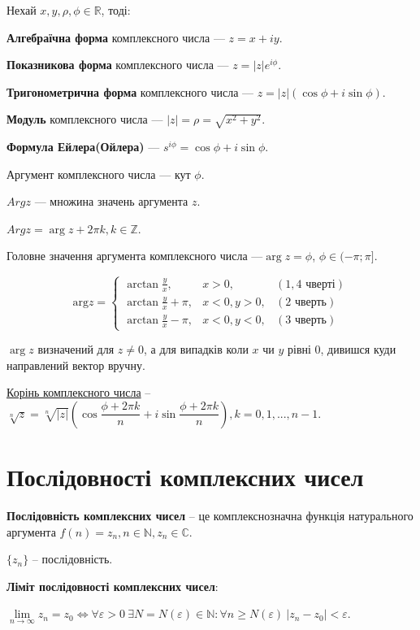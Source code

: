 Нехай $x, y, \rho, \phi \in \mathbb{R}$, тоді:

\textbf{Алгебраїчна форма} комплексного числа --- $z = x + iy$.

\textbf{Показникова форма} комплексного числа --- $z = |z|e^{i \phi}$.

\textbf{Тригонометрична форма} комплексного числа --- $z = |z| (\cos \phi + i \sin \phi)$.

\textbf{Модуль} комплексного числа --- $|z| = \rho = \sqrt{x^2 + y^2}$.

\textbf{Формула Ейлера(Ойлера)} --- $s^{i \phi} = \cos \phi + i \sin \phi$.

Аргумент комплексного числа --- кут $\phi$.

$Arg z$ --- множина значень аргумента $z$.

$Arg z =  \arg z + 2 \pi k, k \in \mathbb{Z}$.

Головне значення аргумента комплексного числа ---$\arg z =  \phi$, $\phi \in ( - \pi; \pi ]$.

$$\text{arg}z = \left\{ \begin{array}{lcr}
\arctan{\frac{y}{x}},       & x>0,      & (1, 4 \text{ чверті}) \\
\arctan{\frac{y}{x}} + \pi, & x<0, y>0, & (2 \text{ чверть}) \\
\arctan{\frac{y}{x}} - \pi, & x<0, y<0, & (3 \text{ чверть})
\end{array}\right. $$

$\arg z$ визначений для $z \neq 0$, а для випадків коли $x$ чи $y$ рівні 0, дивишся куди направлений вектор вручну.

\underline{Корінь комплексного числа} -- $\sqrt[n]{z} = \sqrt[n]{|z|}(\cos\dfrac{\phi+2\pi k}{n} + i\sin\dfrac{\phi+2\pi k}{n}), k=0,1,...,n-1$.



\section{Послідовності комплексних чисел}

\textbf{Послідовність комплексних чисел} -- це комплекснозначна функція натурального аргумента $f(n) = z_n, n\in\mathbb{N}, z_n\in\mathbb{C}$.

$\{z_n\}$ -- послідовність.

\textbf{Ліміт послідовності комплексних чисел}:

$\lim\limits_{n\rightarrow\infty} z_n = z_0 \Leftrightarrow \forall\varepsilon > 0 ~ \exists N = N ( \varepsilon ) \in\mathbb{N} : \forall n \geqslant N(\varepsilon) ~ |z_n-z_0|<\varepsilon$.

